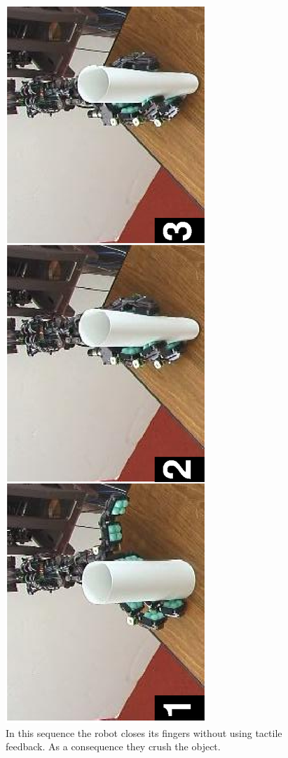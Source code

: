\begin{figure}[tbp]
\centerline{
\includegraphics[height=\columnwidth, angle=270 ]{./figures/PaperNoGentle.eps}
} \caption[Crushing paper cylinder]{In this sequence the robot
closes its fingers without using tactile feedback. As a
consequence they crush the object.} \label{fig:PaperNoGentle}
\end{figure}





